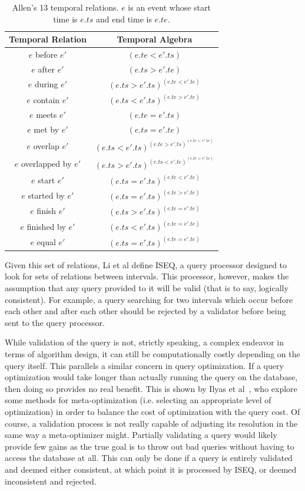 \documentclass{achemso}
\begin{document}
\begin{table}[!ht]\centering
\begin{tabular}{|c|c|}\hline
\textbf{Temporal Relation} & \textbf{Temporal Algebra}\\\hline
$e$ before $e'$ & $(e.te < e'.ts)$\\\hline
$e$ after $e'$ & $(e.ts > e'.te)$\\\hline
$e$ during $e'$ & $(e.ts > e'.ts) ^ (e.te < e'.te)$ \\\hline
$e$ contain $e'$ & $(e.ts < e'.ts) ^ (e.te > e'.te)$ \\\hline
$e$ meets $e'$ & $(e.te = e'.ts)$ \\\hline
$e$ met by $e'$ & $(e.ts = e'.te)$ \\\hline
$e$ overlap $e'$ & $(e.ts < e'.ts) ^ (e.te > e'.ts) ^ (e.te < e'.te)$ \\\hline
$e$ overlapped by $e'$ & $(e.ts > e'.ts) ^ (e.ts < e'.te) ^ (e.te > e'.te)$ \\\hline
$e$ start $e'$ & $(e.ts = e'.ts) ^ (e.te < e'.te)$ \\\hline
$e$ started by $e'$ & $(e.ts = e'.ts) ^ (e.te > e'.te)$ \\\hline
$e$ finish $e'$ & $(e.ts > e'.ts) ^ (e.te = e'.te)$ \\\hline
$e$ finished by $e'$ & $(e.ts < e'.ts) ^ (e.te = e'.te)$ \\\hline
$e$ equal $e'$ & $(e.ts = e'.ts) ^ (e.te = e'.te)$ \\\hline
\end{tabular}
\caption{Allen's 13 temporal relations. $e$ is an event whose start time is $e.ts$ and end time is $e.te$.}\label{tab:relations}
\end{table}

Given this set of relations, Li et al define ISEQ, a query processor designed to look for sets of relations between intervals. This processor, however, makes the assumption that any query provided to it will be valid (that is to say, logically consistent). For example, a query searching for two intervals which occur before each other and after each other should be rejected by a validator before being sent to the query processor.

While validation of the query is not, strictly speaking, a complex endeavor in terms of algorithm design, it can still be computationally costly depending on the query itself. This parallels a similar concern in query optimization. If a query optimization would take longer than actually running the query on the database, then doing so provides no real benefit. This is shown by Ilyas et al~\cite{Ilyas:2003}, who explore some methods for meta-optimization (i.e. selecting an appropriate level of optimization) in order to balance the cost of optimization with the query cost.
Of course, a validation process is not really capable of adjusting its resolution in the same way a meta-optimizer might. Partially validating a query would likely provide few gains as the true goal is to throw out bad queries without having to access the database at all. This can only be done if a query is entirely validated and deemed either consistent, at which point it is processed by ISEQ, or deemed inconsistent and rejected.
\end{document}
